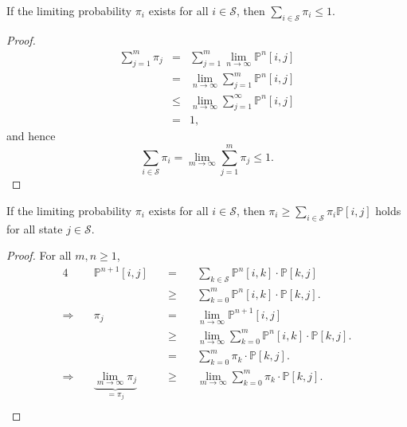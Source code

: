 \begin{inequality} \label{ineq:sum-pi-le-1}
If the limiting probability $ \pi_{i} $ exists for all $ i \in \mathcal{S} $, then $ \sum_{i \in \mathcal{S}} \pi_{i} \le 1 $.

\begin{proof}
\begin{eqnarray*}
\sum_{j = 1}^{m} \pi_{j}
  & = & \sum_{j = 1}^{m} \lim_{n \to \infty} \mathbb{P}^{n}[i, j] \\
  & = & \lim_{n \to \infty} \sum_{j = 1}^{m} \mathbb{P}^{n}[i, j] \\
  & \le & \lim_{n \to \infty} \sum_{j = 1}^{\infty} \mathbb{P}^{n}[i, j] \\
  & = & 1,
\end{eqnarray*}
and hence
\[ \sum_{i \in \mathcal{S}} \pi_{i} = \lim_{m \to \infty} \sum_{j = 1}^{m} \pi_{j} \le 1. \]
\end{proof}
\end{inequality}

\begin{inequality} \label{ineq:pi-ge-pi-times-p}
If the limiting probability $ \pi_{i} $ exists for all $ i \in \mathcal{S} $, then $ \pi_{i} \ge \sum_{i \in \mathcal{S}} \pi_{i} \mathbb{P}[i, j] $ holds for all state $ j \in \mathcal{S} $.

\begin{proof}
For all $ m, n \ge 1 $,
\begin{alignat*}{4}
  & \mathbb{P}^{n + 1}[i, j]
    & \quad=\quad & \sum_{k \in \mathcal{S}} \mathbb{P}^{n}[i, k] \cdot \mathbb{P}[k, j] \\
  & & \quad\ge\quad & \sum_{k = 0}^{m} \mathbb{P}^{n}[i, k] \cdot \mathbb{P}[k, j]. \\
\Rightarrow\quad
  & \pi_{j}
    & \quad=\quad & \lim_{n \to \infty} \mathbb{P}^{n + 1}[i, j] \\
  & & \quad\ge\quad & \lim_{n \to \infty} \sum_{k = 0}^{m} \mathbb{P}^{n}[i, k] \cdot \mathbb{P}[k, j]. \\
  & & \quad=\quad & \sum_{k = 0}^{m} \pi_{k} \cdot \mathbb{P}[k, j]. \\
\Rightarrow\quad
  & \underbrace{\lim_{m \to \infty} \pi_{j}}_{= \pi_{j}}
    & \quad\ge\quad & \lim_{m \to \infty} \sum_{k = 0}^{m} \pi_{k} \cdot \mathbb{P}[k, j]. \\
\end{alignat*}
\end{proof}
\end{inequality}

